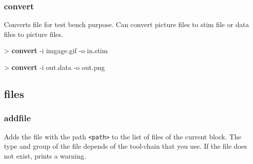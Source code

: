 \documentclass[10pt,a4paper]{article}
\begin{document}

\subsubsection{convert}

Converts file for test bench purpose. Can convert picture files to stim file or data files to picture files.\\


\begin{sampletitle}[1]
> \textbf{\tool{} convert} -i imgage.gif -o in.stim
\end{sampletitle}

\begin{sampletitle}[2]
> \textbf{\tool{} convert} -i out.data -o out.png
\end{sampletitle}

\subsection{files}
\subsubsection{addfile}
\label{subsec:addfile}

Adds the file with the path \texttt{<path>} to the list of files of the current \kind{} block. The type and group of the file depends of the tool-chain that you use. If the file does not exist, prints a warning.\\

\end{document}

